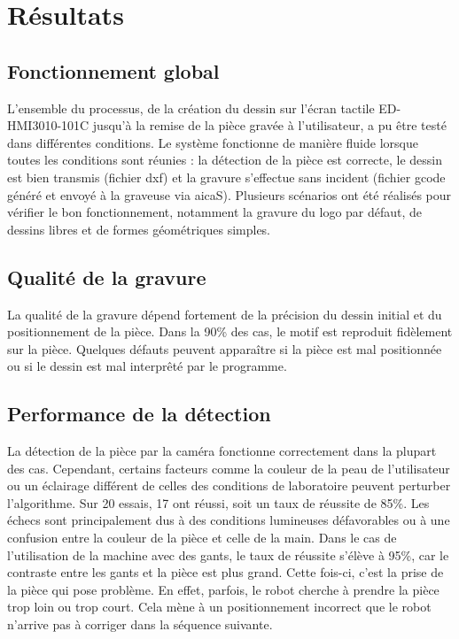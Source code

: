 \chapter{Résultats}

\section{Fonctionnement global}

L'ensemble du processus, de la création du dessin sur l'écran tactile \gls{ED-HMI3010-101C} jusqu'à la remise de la pièce gravée à l'utilisateur, a pu être testé dans différentes conditions. Le système fonctionne de manière fluide lorsque toutes les conditions sont réunies : la détection de la pièce est correcte, le dessin est bien transmis (fichier \gls{dxf}) et la gravure s'effectue sans incident (fichier \gls{gcode} généré et envoyé à la graveuse via \gls{aicaS}). Plusieurs scénarios ont été réalisés pour vérifier le bon fonctionnement, notamment la gravure du logo par défaut, de dessins libres et de formes géométriques simples.

\section{Qualité de la gravure}

La qualité de la gravure dépend fortement de la précision du dessin initial et du positionnement de la pièce. Dans la 90\% des cas, le motif est reproduit fidèlement sur la pièce. Quelques défauts peuvent apparaître si la pièce est mal positionnée ou si le dessin est mal interprêté par le programme.


\section{Performance de la détection}

La détection de la pièce par la caméra fonctionne correctement dans la plupart des cas. Cependant, certains facteurs comme la couleur de la peau de l'utilisateur ou un éclairage différent de celles des conditions de laboratoire peuvent perturber l'algorithme. Sur 20 essais, 17 ont réussi, soit un taux de réussite de 85\%. Les échecs sont principalement dus à des conditions lumineuses défavorables ou à une confusion entre la couleur de la pièce et celle de la main.
Dans le cas de l'utilisation de la machine avec des gants, le taux de réussite s'élève à 95\%, car le contraste entre les gants et la pièce est plus grand. Cette fois-ci, c'est la prise de la pièce qui pose problème. En effet, parfois, le robot cherche à prendre la pièce trop loin ou trop court. Cela mène à un positionnement incorrect que le robot n'arrive pas à corriger dans la séquence suivante.

